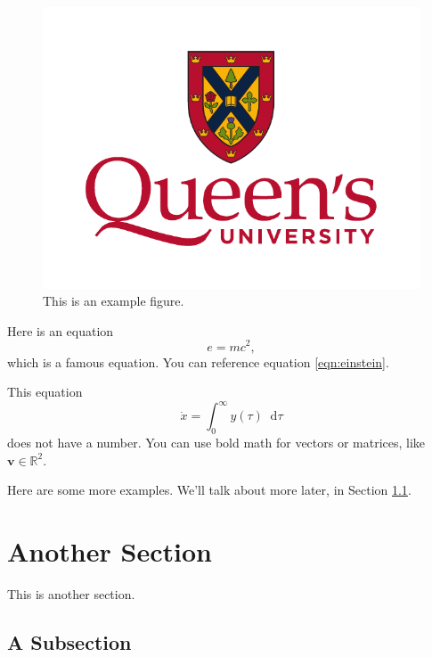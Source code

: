 \documentclass[letterpaper,fleqn,oneside]{qu-handout}
\newcommand{\Real}{\mathbb R}
\newcommand{\mbf}{\mathbf}
\newcommand*\dif{\mathop{}\!\mathrm{d}}
\begin{document}
\begin{figure}
  \begin{center}
    \includegraphics[width=\textwidth]{figs/qu-logo-vertical-colour.pdf}
    \caption{This is an example figure.}
    \label{fig:example}
  \end{center}
\end{figure}

Here is an equation
\begin{equation}
  \label{eqn:einstein}
  e = mc^2,
\end{equation}
which is a famous equation.  You can reference equation \eqref{eqn:einstein}.

This equation
\begin{equation*}
  \dot{x} = \int_{0}^\infty y(\tau)\dif\tau
\end{equation*}
does not have a number.  You can use bold math for vectors or matrices, like $\mbf{v}\in\Real^2$.

Here are some more examples.  We'll talk about more later, in Section \ref{sec:special}.

\section{Another Section}

This is another section.

\subsection{A Subsection}
\label{sec:special}
\end{document}
